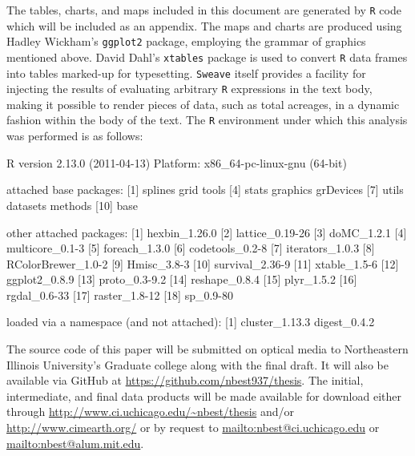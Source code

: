 The tables, charts, and maps included in this document are generated
by \texttt{R} code which will be included as an appendix.  The maps
and charts are produced using Hadley Wickham's
\citeyearpar{Wickham2009} \texttt{ggplot2} package, employing the
grammar of graphics mentioned above.  David Dahl's \texttt{xtables}
package is used to convert \texttt{R} data frames into tables
marked-up for typesetting.  \texttt{Sweave} itself provides a facility
for injecting the results of evaluating arbitrary \texttt{R}
expressions in the text body, making it possible to render pieces of
data, such as total acreages, in a dynamic fashion within the body of
the text.  The \texttt{R} environment under which this analysis was
performed is as follows:

\begin{Schunk}
\begin{Soutput}
R version 2.13.0 (2011-04-13)
Platform: x86_64-pc-linux-gnu (64-bit)

attached base packages:
 [1] splines   grid      tools    
 [4] stats     graphics  grDevices
 [7] utils     datasets  methods  
[10] base     

other attached packages:
 [1] hexbin_1.26.0     
 [2] lattice_0.19-26   
 [3] doMC_1.2.1        
 [4] multicore_0.1-3   
 [5] foreach_1.3.0     
 [6] codetools_0.2-8   
 [7] iterators_1.0.3   
 [8] RColorBrewer_1.0-2
 [9] Hmisc_3.8-3       
[10] survival_2.36-9   
[11] xtable_1.5-6      
[12] ggplot2_0.8.9     
[13] proto_0.3-9.2     
[14] reshape_0.8.4     
[15] plyr_1.5.2        
[16] rgdal_0.6-33      
[17] raster_1.8-12     
[18] sp_0.9-80         

loaded via a namespace (and not attached):
[1] cluster_1.13.3 digest_0.4.2  
\end{Soutput}
\end{Schunk}


The source code of this paper will be submitted on optical media to
Northeastern Illinois University's Graduate college along with the
final draft.  It will also be available via GitHub at
\url{https://github.com/nbest937/thesis}.  The initial, intermediate,
and final data products will be made available for download either
through \url{http://www.ci.uchicago.edu/~nbest/thesis} and\slash or
\url{http://www.cimearth.org/} or by request to
\url{mailto:nbest@ci.uchicago.edu} or \url{mailto:nbest@alum.mit.edu}.
